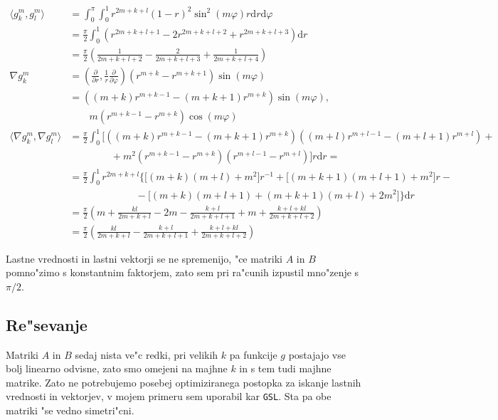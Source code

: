 \documentclass[a4paper,10pt]{article}
\renewcommand{\phi}{\varphi}
\newcommand{\dd}{\mathrm{d}}
\newcommand{\parcialno}[2]{
  \frac{\partial #1}{\partial #2}
}
\begin{document}
\begin{align}
\langle g_{k}^{m}, g_{l}^{m} \rangle &= \int_0^\pi \int_0^1 r^{2m+k+l}(1-r)^2 \sin^2 (m\phi) r \dd r \dd \phi \nonumber \\
  &= \frac{\pi}{2} \int_0^1 \left( r^{2m+k+l+1} -2r^{2m+k+l+2} + r^{2m+k+l+3} \right) \dd r \nonumber \\
  &= \frac{\pi}{2} \left( \frac{1}{2m+k+l+2} - \frac{2}{2m+k+l+3} + \frac{1}{2m+k+l+4} \right) \\
  \nabla g_{k}^{m} &= \left( \parcialno{}{r}, \frac{1}{r} \parcialno{}{\phi} \right) \left( r^{m+k} - r^{m+k+1}\right) \sin(m\phi) \nonumber \\
  &= \left((m+k)r^{m+k-1} - (m+k+1)r^{m+k} \right)\sin(m\phi), \nonumber \\
  & {} \quad \quad m\left( r^{m+k-1} - r^{m+k}\right) \cos(m\phi) \\
  \langle \nabla g_{k}^{m}, \nabla g_{l}^{m} \rangle &= \frac{\pi}{2} \int_0^1 \Big[ \left((m+k)r^{m+k-1} - (m+k+1)r^{m+k} \right)\left((m+l)r^{m+l-1} - (m+l+1)r^{m+l} \right) + \nonumber \\
  & {} \hspace{50pt} + m^2 \left( r^{m+k-1} - r^{m+k}\right)\left( r^{m+l-1} - r^{m+l}\right) \Big] r \dd r = \nonumber \\
  &= \frac{\pi}{2} \int_0^1 r^{2m+k+l} \Big\{ \big[ (m+k)(m+l) + m^2 \big] r^{-1} + \big[ (m+k+1)(m+l+1) + m^2 \big]r - \nonumber \\ 
  & \hspace{80pt} - \big[ (m+k)(m+l+1) + (m+k+1)(m+l) + 2m^2 \big] \Big\} \dd r \nonumber \\
  &= \frac{\pi}{2} \left( m + \frac{kl}{2m+k+l} -2m - \frac{k + l}{2m+k+l+1} + m + \frac{k+l + kl}{2m+k+l+2} \right) \nonumber \\
  &= \frac{\pi}{2} \left( \frac{kl}{2m+k+l} - \frac{k + l}{2m+k+l+1} + \frac{k+l + kl}{2m+k+l+2} \right)
\end{align}

Lastne vrednosti in lastni vektorji se ne spremenijo, "ce matriki $A$ in $B$ pomno"zimo s konstantnim faktorjem, zato sem pri ra"cunih izpustil mno"zenje s $\pi/2$. 

\subsection{Re"sevanje}

Matriki $A$ in $B$ sedaj nista ve"c redki, pri velikih $k$ pa funkcije $g$ postajajo vse bolj linearno odvisne, zato smo omejeni na majhne $k$ in s tem tudi majhne matrike. Zato ne potrebujemo posebej optimiziranega postopka za iskanje lastnih vrednosti in vektorjev, v mojem primeru sem uporabil kar \texttt{GSL}. Sta pa obe matriki "se vedno simetri"cni. 
\end{document}

